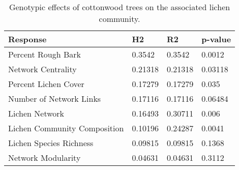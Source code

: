 \begin{table}[ht]
\centering
\begin{tabular}{llll}
  \hline
Response & H2 & R2 & p-value \\ 
  \hline
Percent Rough Bark & 0.3542 & 0.3542 & 0.0012 \\ 
  Network Centrality & 0.21318 & 0.21318 & 0.03118 \\ 
  Percent Lichen Cover & 0.17279 & 0.17279 & 0.035 \\ 
  Number of Network Links & 0.17116 & 0.17116 & 0.06484 \\ 
  Lichen Network & 0.16493 & 0.30711 & 0.006 \\ 
  Lichen Community Composition & 0.10196 & 0.24287 & 0.0041 \\ 
  Lichen Species Richness & 0.09815 & 0.09815 & 0.1368 \\ 
  Network Modularity & 0.04631 & 0.04631 & 0.3112 \\ 
   \hline
\end{tabular}
\caption{Genotypic effects of cottonwood trees on the associated lichen community.} 
\label{tab:h2_table}
\end{table}
